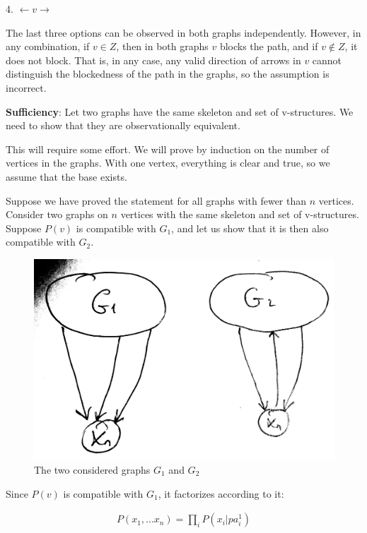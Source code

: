 \documentclass[fleqn]{article}
\numberwithin{equation}{section}
\numberwithin{theorem}{section}
\numberwithin{figure}{section}
\numberwithin{lemma}{section}
\numberwithin{corollary}{section}
\begin{document}
4. \( \leftarrow v \rightarrow \)

The last three options can be observed in both graphs independently. However, in any combination, if \( v \in Z \), then in both graphs \( v \) blocks the path, and if \( v \notin Z \), it does not block. That is, in any case, any valid direction of arrows in \( v \) cannot distinguish the blockedness of the path in the graphs, so the assumption is incorrect.

\textbf{Sufficiency}: Let two graphs have the same skeleton and set of v-structures. We need to show that they are observationally equivalent.

This will require some effort. We will prove by induction on the number of vertices in the graphs. With one vertex, everything is clear and true, so we assume that the base exists.

Suppose we have proved the statement for all graphs with fewer than \( n \) vertices. Consider two graphs on \( n \) vertices with the same skeleton and set of v-structures. Suppose \( P(v) \) is compatible with \( G_1 \), and let us show that it is then also compatible with \( G_2 \).

\begin{figure}[h]
	\begin{center}
		\includegraphics[scale=0.1]{imgs/img10.png}
	\end{center}
	\caption{The two considered graphs \( G_1 \) and \( G_2 \)}
	\label{fig:equiv1}
\end{figure}

Since \( P(v) \) is compatible with \( G_1 \), it factorizes according to it:

\begin{align}
	P(x_1,...x_n) = \prod\limits_{i}P(x_i|pa^1_{i})
\end{align}
	
\end{document}
